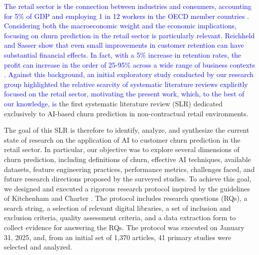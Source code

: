 \documentclass[preprint,12pt]{elsarticle}
\begin{document}
\textcolor{blue}{The retail sector is the connection between industries and consumers, accounting for 5\% of GDP and employing 1 in 12 workers in the OECD member countries \cite{OECD2020}.  
Considering both the macroeconomic weight and the economic implications, focusing on churn prediction in the retail sector is particularly relevant.
Reichheld and Sasser show that even small improvements in customer retention can have substantial financial effects. In fact, with a 5\% increase in retention rates, the profit can increase in the order of 25-95\% across a wide range of business contexts \cite{Zero-defections-Reichheld}.}
\textcolor{blue}{Against this background, an initial exploratory study conducted by our research group highlighted the relative scarcity of systematic literature reviews explicitly focused on the retail sector, motivating the present work, which, to the best of our knowledge, is} the first systematic literature review (SLR) dedicated exclusively to AI-based churn prediction in non-contractual retail environments.

The goal of this SLR is therefore to identify, analyze, and synthesize the current state of research on the application of AI to customer churn prediction in the retail sector. 
In particular, our objective was to explore several dimensions of churn prediction, including definitions of churn, effective AI techniques, available datasets, feature engineering practices, performance metrics, challenges faced, and future research directions proposed by the surveyed studies. %
To achieve this goal, we designed and executed a rigorous research protocol inspired by the guidelines of Kitchenham and Charter \cite{Kitchenham-Charters-guidelines}. The protocol includes research questions (RQs), a search string, a selection of relevant digital libraries, a set of inclusion and exclusion criteria, quality assessment criteria, and a data extraction form to collect evidence for answering the RQs. The protocol was executed on January 31, 2025, and, from an initial set of 1,370 articles, 41 primary studies were selected and analyzed.  \\
\end{document}
